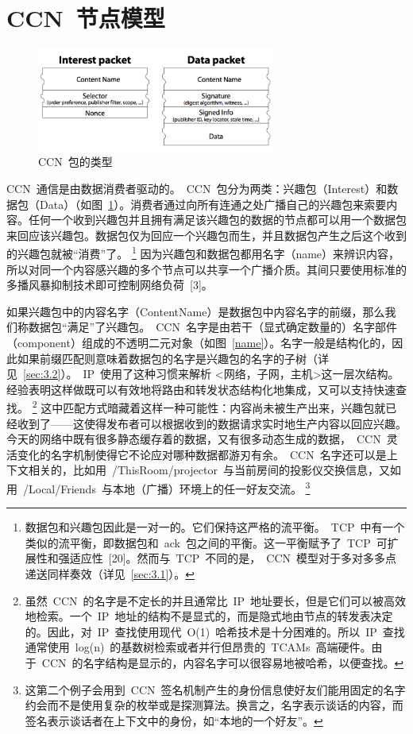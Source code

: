 \section{CCN~节点模型}
\label{sec:2}

\begin{figure}[htbp]
  \centering
  \includegraphics[width=0.7\textwidth]{images/packet_types}
  \caption{CCN~包的类型} 
  \label{packet_types}
\end{figure}

CCN~通信是由数据消费者驱动的。~CCN~包分为两类：兴趣包（Interest）和数据包（Data）（如图~\ref{packet_types}）。消费者通过向所有连通之处广播自己的兴趣包来索要内容。任何一个收到兴趣包并且拥有满足该兴趣包的数据的节点都可以用一个数据包来回应该兴趣包。数据包仅为回应一个兴趣包而生，并且数据包产生之后这个收到的兴趣包就被“消费”了。
\renewcommand\baselinestretch{1} %
\footnote{数据包和兴趣包因此是一对一的。它们保持这严格的流平衡。~TCP~中有一个类似的流平衡，即数据包和~ack~包之间的平衡。这一平衡赋予了~TCP~可扩展性和强适应性~[20]。然而与~TCP~不同的是，~CCN~模型对于多对多多点递送同样奏效（详见~\ref{sec:3.1}）。}
因为兴趣包和数据包都用名字（name）来辨识内容，所以对同一个内容感兴趣的多个节点可以共享一个广播介质。其间只要使用标准的多播风暴抑制技术即可控制网络负荷~[3]。%

如果兴趣包中的内容名字（ContentName）是数据包中内容名字的前缀，那么我们称数据包“满足”了兴趣包。~CCN~名字是由若干（显式确定数量的）名字部件（component）组成的不透明二元对象（如图~\ref{name}）。名字一般是结构化的，因此如果前缀匹配则意味着数据包的名字是兴趣包的名字的子树（详见~\ref{sec:3.2}）。~IP~使用了这种习惯来解析 <网络，子网，主机>这一层次结构。经验表明这样做既可以有效地将路由和转发状态结构化地集成，又可以支持快速查找。%
\renewcommand\baselinestretch{1} %
\footnote{虽然~CCN~的名字是不定长的并且通常比~IP~地址要长，但是它们可以被高效地检索。一个~IP~地址的结构不是显式的，而是隐式地由节点的转发表决定的。因此，对~IP~查找使用现代~O(1)~哈希技术是十分困难的。所以~IP~查找通常使用~log(n)~的基数树检索或者并行但昂贵的~TCAMs~高端硬件。由于~CCN~的名字结构是显示的，内容名字可以很容易地被哈希，以便查找。}
这中匹配方式暗藏着这样一种可能性：内容尚未被生产出来，兴趣包就已经收到了——这使得发布者可以根据收到的数据请求实时地生产内容以回应兴趣。今天的网络中既有很多静态缓存着的数据，又有很多动态生成的数据，~CCN~灵活变化的名字机制使得它不论应对哪种数据都游刃有余。~CCN~名字还可以是上下文相关的，比如用~/ThisRoom/projector~与当前房间的投影仪交换信息，又如用~/Local/Friends~与本地（广播）环境上的任一好友交流。
\renewcommand\baselinestretch{1} %
\footnote{这第二个例子会用到~CCN~签名机制产生的身份信息使好友们能用固定的名字约会而不是使用复杂的枚举或是探测算法。换言之，名字表示谈话的内容，而签名表示谈话者在上下文中的身份，如“本地的一个好友”。}

